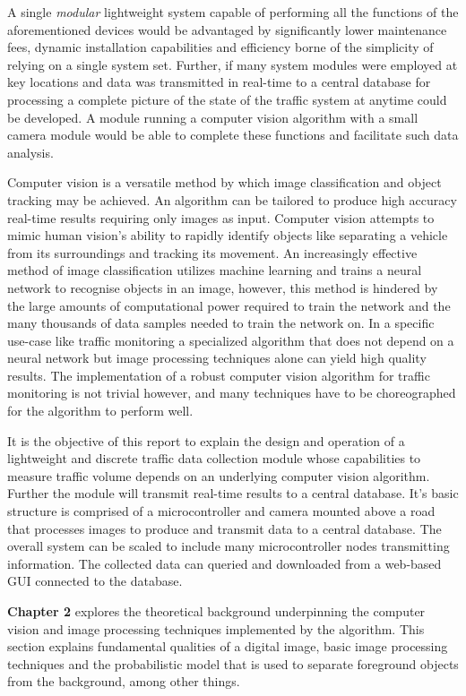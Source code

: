A single \emph{modular} lightweight system capable of performing all the functions of the aforementioned devices would be advantaged by significantly lower maintenance fees, dynamic installation capabilities and efficiency borne of the simplicity of relying on a single system set. Further, if many system modules were employed at key locations and data was transmitted in real-time to a central database for processing a complete picture of the state of the traffic system at anytime could be developed. A module running a computer vision algorithm with a small camera module would be able to complete these functions and facilitate such data analysis.

Computer vision is a versatile method by which image classification and object tracking may be achieved. An algorithm can be tailored to produce high accuracy real-time results requiring only images as input. Computer vision attempts to mimic human vision's ability to rapidly identify objects like separating a vehicle from its surroundings and tracking its movement. An increasingly effective method of image classification utilizes machine learning and trains a neural network to recognise objects in an image, however, this method is hindered by the large amounts of computational power required to train the network and the many thousands of data samples needed to train the network on. In a specific use-case like traffic monitoring a specialized algorithm that does not depend on a neural network but image processing techniques alone can yield high quality results. The implementation of a robust computer vision algorithm for traffic monitoring is not trivial however, and many techniques have to be choreographed for the algorithm to perform well.

It is the objective of this report to explain the design and operation of a lightweight and discrete traffic data collection module whose capabilities to measure traffic volume depends on an underlying computer vision algorithm. Further the module will transmit real-time results to a central database. It's basic structure is comprised of a microcontroller and camera mounted above a road that processes images to produce and transmit data to a central database. The overall system can be scaled to include many microcontroller nodes transmitting information. The collected data can queried and downloaded from a web-based GUI connected to the database.

\textbf{Chapter 2} explores the theoretical background underpinning the computer vision and image processing techniques implemented by the algorithm. This section explains fundamental qualities of a digital image, basic image processing techniques and the probabilistic model that is used to separate foreground objects from the background, among other things. 

